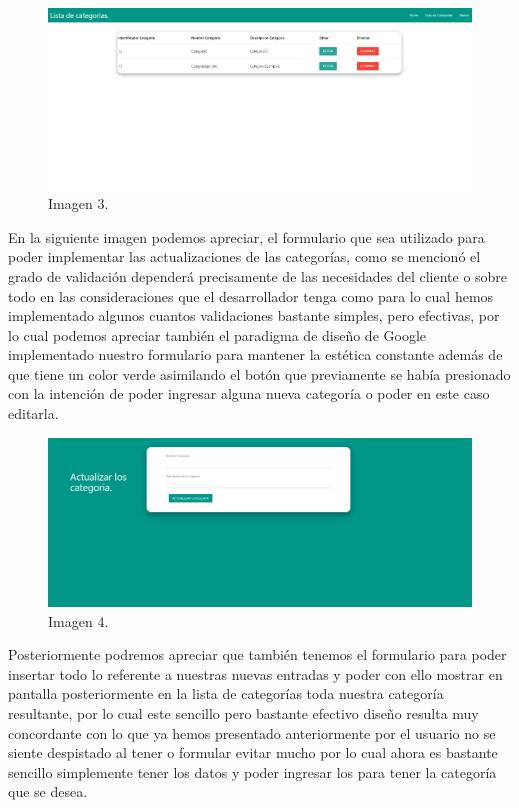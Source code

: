 \documentclass[10pt,a4paper]{article}
\begin{document}
\begin{figure}[h]
\centering
\includegraphics[width=13cm]{3}
\caption{Imagen 3.}
\label{fig:figure1}
\end{figure}

En la siguiente imagen podemos apreciar, el formulario que sea utilizado para poder implementar las actualizaciones de las categorías, como se mencionó el grado de validación dependerá precisamente de las necesidades del cliente o sobre todo en las consideraciones que el desarrollador tenga como para lo cual hemos implementado algunos cuantos validaciones bastante simples, pero efectivas, por lo cual podemos apreciar también el paradigma de diseño de Google implementado nuestro formulario para mantener la estética constante además de que tiene un color verde asimilando el botón que previamente se había presionado con la intención de poder ingresar alguna nueva categoría o poder en este caso editarla.

\begin{figure}[h]
\centering
\includegraphics[width=13cm]{4}
\caption{Imagen 4.}
\label{fig:figure1}
\end{figure}

\vspace{60mm}


Posteriormente podremos apreciar que también tenemos el formulario para poder insertar todo lo referente a nuestras nuevas entradas y poder con ello mostrar en pantalla posteriormente en la lista de categorías toda nuestra categoría resultante, por lo cual este sencillo pero bastante efectivo diseño resulta muy concordante con lo que ya hemos presentado anteriormente por el usuario no se siente despistado al tener o formular evitar mucho por lo cual ahora es bastante sencillo simplemente tener los datos y poder ingresar los para tener la categoría que se desea.
\end{document}
